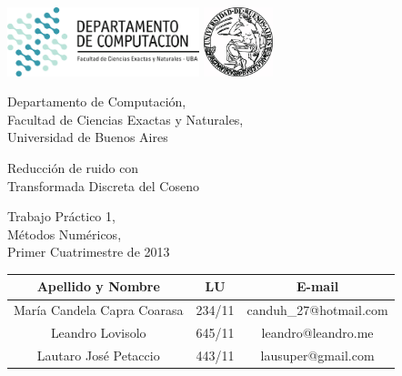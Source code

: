 \documentclass[a4paper,10pt,twoside]{article}
\begin{document}


\thispagestyle{caratula}

\begin{center}

\includegraphics[height=2cm]{DC.png} 
\hfill
\includegraphics[height=2cm]{UBA.jpg} 

\vspace{2cm}

Departamento de Computación,\\
Facultad de Ciencias Exactas y Naturales,\\
Universidad de Buenos Aires

\vspace{1cm}

\begin{spacing}{2.5}
\begin{Huge}
Reducción de ruido con \\Transformada Discreta del Coseno
\end{Huge}
\end{spacing}

\vspace{1cm}

Trabajo Práctico 1, \\
Métodos Numéricos, \\
Primer Cuatrimestre de 2013

\vspace{6cm}

\begin{tabular}{|c|c|c|}
\hline
Apellido y Nombre & LU & E-mail\\
\hline
María Candela Capra Coarasa & 234/11 & canduh\_27@hotmail.com\\
Leandro Lovisolo            & 645/11 & leandro@leandro.me\\
Lautaro José Petaccio       & 443/11 & lausuper@gmail.com\\
\hline
\end{tabular}

\end{center}
\vspace{1cm}
\end{document}
